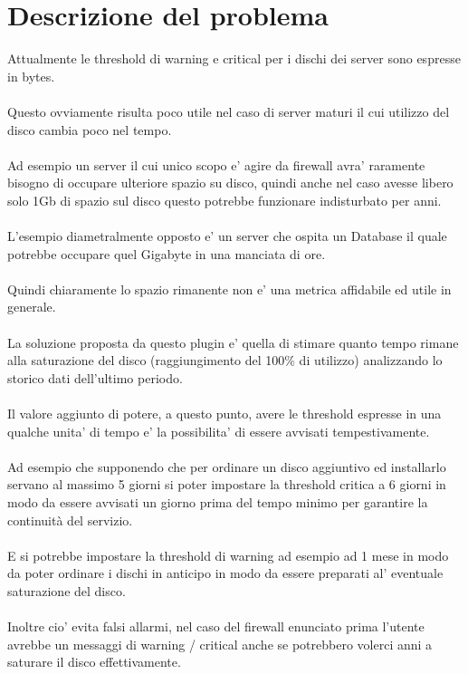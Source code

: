 \documentclass{article}
\begin{document}
\part*{Descrizione del problema}
Attualmente le threshold di warning e critical per i dischi dei server sono espresse in bytes.
\\\\
Questo ovviamente risulta poco utile nel caso di server maturi il cui utilizzo del disco cambia poco nel tempo.
\\\\
Ad esempio un server il cui unico scopo e' agire da firewall avra' raramente bisogno di occupare ulteriore spazio su disco, quindi anche nel caso avesse libero solo 1Gb di spazio sul disco questo potrebbe funzionare indisturbato per anni.
\\\\
L'esempio diametralmente opposto e' un server che ospita un Database il quale potrebbe occupare quel Gigabyte in una manciata di ore.
\\\\
Quindi chiaramente lo spazio rimanente non e' una metrica affidabile ed utile in generale.
\\\\
La soluzione proposta da questo plugin e' quella di stimare quanto tempo rimane alla saturazione del disco (raggiungimento del 100\% di utilizzo) analizzando lo storico dati dell'ultimo periodo.
\\\\
Il valore aggiunto di potere, a questo punto, avere le threshold espresse in una qualche unita' di tempo e' la possibilita' di essere avvisati tempestivamente.
\\\\
Ad esempio che supponendo che per ordinare un disco aggiuntivo ed installarlo servano al massimo 5 giorni si poter impostare la threshold critica a 6 giorni in modo da essere avvisati un giorno prima del tempo minimo per garantire la continuità del servizio.
\\\\
E si potrebbe impostare la threshold di warning ad esempio ad 1 mese in modo da poter ordinare i dischi in anticipo in modo da essere preparati al' eventuale saturazione del disco.
\\\\
Inoltre cio' evita falsi allarmi, nel caso del firewall enunciato prima l'utente avrebbe un messaggi di warning / critical anche se potrebbero volerci anni a saturare il disco effettivamente.
\end{document}
